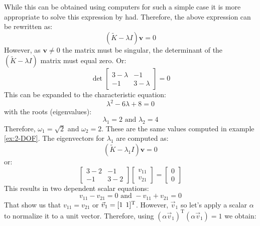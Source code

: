 \documentclass[12pt,letter]{article}
\begin{document}
\begin{example}
	While this can be obtained using computers for such a simple case it is more appropriate to solve this expression by had. Therefore, the above expression can be rewritten as:
	\begin{equation}
	(\widetilde{K} - \lambda I)\textbf{v} =  0
	\end{equation}
	However, as $\textbf{v} \neq 0$ the matrix must be singular, the determinant of the $(\widetilde{K} - \lambda I)$ matrix must equal zero. Or:
	\begin{equation}
	\det \begin{bmatrix} 3-\lambda & -1 \\    -1  & 3-\lambda \end{bmatrix}  =  0
	\end{equation}
	This can be expanded to the characteristic equation:
	\begin{equation}
	\lambda^2 -6\lambda + 8  =  0
	\end{equation}
	with the roots (eigenvalues):
	\begin{equation}
	\lambda_1 = 2\text{ and } \lambda_2 = 4
	\end{equation}
	Therefore, $\omega_1=\sqrt{2}$ and $\omega_2=2$. These are the same values computed in example \ref{ex:2-DOF}. The eigenvectors for $\lambda_1$ are computed as:
	\begin{equation}
	(\widetilde{K} - \lambda_1 I)\textbf{v} =  0
	\end{equation}
	or:
	\begin{equation}
	\begin{bmatrix} 3-2 & -1 \\    -1  & 3-2 \end{bmatrix} \begin{bmatrix} v_{11} \\ v_{21}  \end{bmatrix} =  \begin{bmatrix} 0 \\ 0  \end{bmatrix}
	\end{equation}
	This results in two dependent scalar equations:
	\begin{equation}
	v_{11} - v_{21} = 0 \text{ and } -v_{11} + v_{21} =0
	\end{equation}
	That show us that $v_{11} = v_{21}$ or $\vec{v}_1=[1 \hspace{1ex} 1]^\text{T}$. However, $\vec{v}_1$ so let's apply a scalar $\alpha$ to normalize it to a unit vector. Therefore, using $(\alpha \vec{v}_1)^\text{T}(\alpha \vec{v}_1) = 1$ we obtain:

\end{example}
\end{document}
